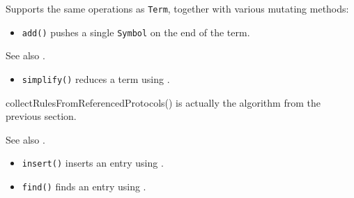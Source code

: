\documentclass[../generics]{subfiles}
\begin{document}
Supports the same operations as \texttt{Term}, together with various mutating methods:
\begin{itemize}
\item \texttt{add()} pushes a single \texttt{Symbol} on the end of the term.
\end{itemize}



See also .

\begin{itemize}
\item \texttt{simplify()} reduces a term using .
\end{itemize}


collectRulesFromReferencedProtocols() is actually the algorithm from the previous section.


See also .
\begin{itemize}
\item \texttt{insert()} inserts an entry using .
\item \texttt{find()} finds an entry using .
\end{itemize}
\end{document}
